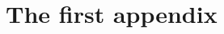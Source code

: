 \documentclass[11pt]{article}
\begin{document}
\begin{acknowledgements}
  \blindtext
\end{acknowledgements}









\vfill
\pagebreak
\appendix

\section{The first appendix}

\blindtext
\end{document}
